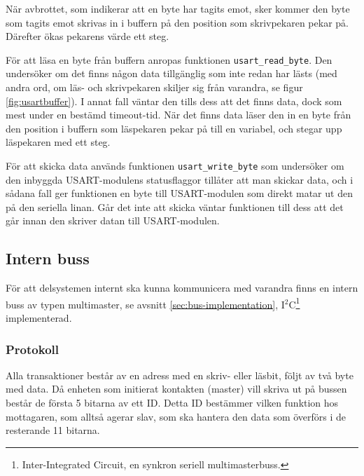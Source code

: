 När avbrottet, som indikerar att en byte har tagits emot, sker kommer den byte som tagits emot skrivas in i buffern på den position som skrivpekaren pekar på. Därefter ökas pekarens värde ett steg.


För att läsa en byte från buffern anropas funktionen \verb|usart_read_byte|. Den undersöker om det finns någon data tillgänglig som inte redan har lästs (med andra ord, om läs- och skrivpekaren skiljer sig från varandra, se figur \ref{fig:usartbuffer}). I annat fall väntar den tills dess att det finns data, dock som mest under en bestämd timeout-tid. När det finns data läser den in en byte från den position i buffern som läspekaren pekar på till en variabel, och stegar upp läspekaren med ett steg.

För att skicka data används funktionen \verb|usart_write_byte| som undersöker om den inbyggda USART-modulens statusflaggor tillåter att man skickar data, och i sådana fall ger funktionen en byte till USART-modulen som direkt matar ut den på den seriella linan. Går det inte att skicka väntar funktionen till dess att det går innan den skriver datan till USART-modulen.

\subsection{Intern buss}
\label{sec:bus}

För att delsystemen internt ska kunna kommunicera med varandra finns en intern buss av typen multimaster, se avsnitt \ref{sec:bus-implementation}, I$^2$C\footnote{Inter-Integrated Circuit, en synkron seriell multimasterbuss.\cite{i2c}} implementerad.

\subsubsection{Protokoll}
\label{sec:bus-protokoll}
Alla transaktioner består av en adress med en skriv- eller läsbit, följt av två byte med data. Då enheten som initierat kontakten (master) vill skriva ut på bussen består de första 5 bitarna av ett ID. Detta ID bestämmer vilken funktion hos mottagaren, som alltså agerar slav, som ska hantera den data som överförs i de resterande 11 bitarna.


